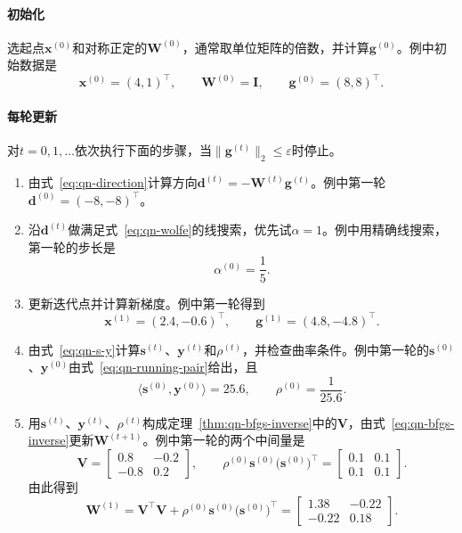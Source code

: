 \paragraph{初始化}
选起点$\bm{x}^{(0)}$和对称正定的$\bm{W}^{(0)}$，通常取单位矩阵的倍数，并计算$\bm{g}^{(0)}$。例中初始数据是
\[
 \bm{x}^{(0)}=(4,1)^\top,\qquad\bm{W}^{(0)}=\bm{I},\qquad\bm{g}^{(0)}=(8,8)^\top.
\]

\paragraph{每轮更新}
对$t=0,1,\ldots$依次执行下面的步骤，当$\lVert\bm{g}^{(t)}\rVert_2\leq\varepsilon$时停止。

\begin{enumerate}
\item 由式~\eqref{eq:qn-direction}计算方向$\bm{d}^{(t)}=-\bm{W}^{(t)}\bm{g}^{(t)}$。例中第一轮$\bm{d}^{(0)}=(-8,-8)^\top$。

\item 沿$\bm{d}^{(t)}$做满足式~\eqref{eq:qn-wolfe}的线搜索，优先试$\alpha=1$。例中用精确线搜索，第一轮的步长是
\[
 \alpha^{(0)}=\frac15.
\]

\item 更新迭代点并计算新梯度。例中第一轮得到
\[
 \bm{x}^{(1)}=(2.4,-0.6)^\top,\qquad\bm{g}^{(1)}=(4.8,-4.8)^\top.
\]

\item 由式~\eqref{eq:qn-s-y}计算$\bm{s}^{(t)}$、$\bm{y}^{(t)}$和$\rho^{(t)}$，并检查曲率条件。例中第一轮的$\bm{s}^{(0)}$、$\bm{y}^{(0)}$由式~\eqref{eq:qn-running-pair}给出，且
\[
 \langle\bm{s}^{(0)},\bm{y}^{(0)}\rangle=25.6,\qquad\rho^{(0)}=\frac{1}{25.6}.
\]

\item 用$\bm{s}^{(t)}$、$\bm{y}^{(t)}$、$\rho^{(t)}$构成定理~\ref{thm:qn-bfgs-inverse}中的$\bm{V}$，由式~\eqref{eq:qn-bfgs-inverse}更新$\bm{W}^{(t+1)}$。例中第一轮的两个中间量是
\[
 \bm{V}=\begin{bmatrix}0.8&-0.2\\-0.8&0.2\end{bmatrix},\qquad
 \rho^{(0)}\bm{s}^{(0)}\bigl(\bm{s}^{(0)}\bigr)^\top=\begin{bmatrix}0.1&0.1\\0.1&0.1\end{bmatrix}.
\]
由此得到
\[
 \bm{W}^{(1)}=\bm{V}^\top\bm{V}+\rho^{(0)}\bm{s}^{(0)}\bigl(\bm{s}^{(0)}\bigr)^\top
 =\begin{bmatrix}1.38&-0.22\\-0.22&0.18\end{bmatrix}.
\]
\end{enumerate}

